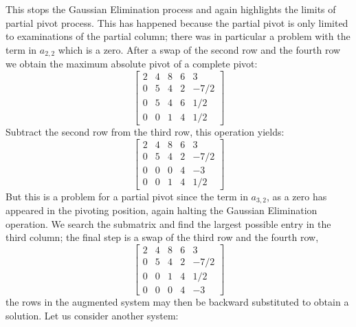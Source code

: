 \documentclass[7pt]{article}
\begin{document}
This stops the Gaussian Elimination process and again highlights the limits of partial pivot process.  This has happened because the partial pivot is only limited to examinations of the partial column; there was in particular a problem with the term in $a_{2,2}$ which is a zero.  After a swap of the second row and the fourth row we obtain the maximum absolute pivot of a complete pivot:
\begin{equation*}
\left[
\begin{array}{rrrr|r}%
2 & 4 & 8  & 6 & 3 \\  
0 & 5 & 4 & 2  & -7 /2 \\
0 & 5 & 4 & 6  & 1/2  \\
0 & 0  & 1  & 4  & 1/2
\end{array}  
\right]
\end{equation*}
Subtract the second row from  the third row, this operation yields:
\begin{equation*}
\left[
\begin{array}{rrrr|r}%
2 & 4 & 8  & 6 & 3 \\  
0 & 5 & 4 & 2  & -7 /2 \\
0 & 0 & 0 & 4  & -3  \\
0 & 0  & 1  & 4  & 1/2
\end{array}  
\right]
\end{equation*}
But this is a problem for a partial pivot since the term in $a_{3,2}$, as a zero has appeared in the pivoting position, again halting the Gaussian Elimination operation. We search the submatrix and find the largest possible entry in the third column; the final step is a swap of the third row and the fourth row, 
\begin{equation*}
\left[
\begin{array}{rrrr|r}%
2 & 4 & 8  & 6 & 3 \\  
0 & 5 & 4 & 2  & -7 /2 \\
0 & 0  & 1  & 4  & 1/2 \\
0 & 0 & 0 & 4  & -3  
\end{array}  
\right]
\end{equation*}
the rows in the augmented system may then be backward substituted to obtain a solution.  
\newpage
Let us consider another system:
\end{document}
